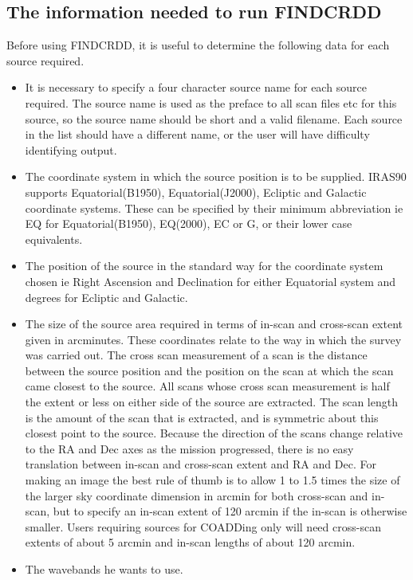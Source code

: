 \documentclass[twoside,11pt]{starlink}
\begin{document}
\subsection{The information needed to run FINDCRDD}
Before using FINDCRDD, it is useful to determine the following data for each
source required.
\begin{itemize}
\item It is necessary to specify a four character source name for each source
required. The source name is used as the preface to all scan files etc for
this source, so the source name should be short and a valid filename. Each
source in the list should have a different name, or the user will have
difficulty identifying output.
\item The coordinate system in which the source position is to be supplied.
IRAS90 supports Equatorial(B1950), Equatorial(J2000), Ecliptic and Galactic
coordinate systems. These can be specified by their minimum abbreviation ie EQ
for Equatorial(B1950), EQ(2000), EC or G, or their lower case equivalents.
\item The position of the source in the standard way for the coordinate
system chosen ie Right Ascension and Declination for either Equatorial system
and degrees for Ecliptic and Galactic.
\item The size of the source area required in terms of in-scan and cross-scan
extent given in arcminutes. These coordinates relate to the way in which the
survey was carried out. The cross scan measurement of a scan is the distance
between the  source position and the position on the scan at which the scan
came closest to the source. All scans whose cross scan measurement is half the
extent or less on either side of the source are extracted. The scan length is
the amount of the scan that is extracted, and is symmetric about this closest
point to the source. Because the direction of the scans change relative to
the RA and Dec axes as the mission progressed, there is no easy translation
between in-scan and cross-scan extent and RA and Dec. For making an image
the best rule of thumb is to allow 1 to 1.5 times the size of the larger sky
coordinate dimension in arcmin for both cross-scan and in-scan, but to specify
an in-scan extent of 120 arcmin if the in-scan is otherwise smaller. Users
requiring sources for COADDing only will need cross-scan extents of about
5 arcmin and in-scan lengths of about 120 arcmin.
\item The wavebands he wants to use.
\end{itemize}
\end{document}
